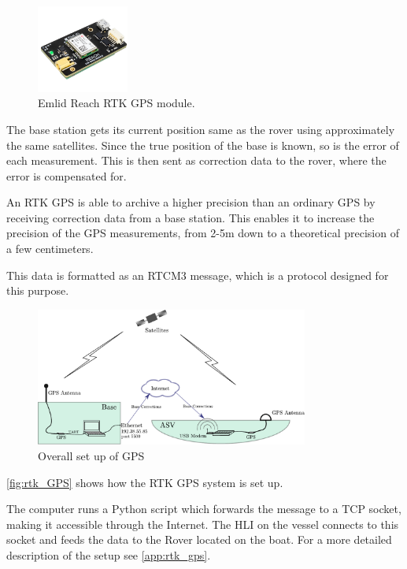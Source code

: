 \begin{figure}[H]
  \includegraphics[width=0.27\textwidth]{figures/emlidReach}
  \caption{Emlid Reach RTK GPS module.\cite{EmlidReachDocs}}
  \label{fig:emlidReach}
\end{figure}

The base station gets its current position same as the rover using approximately the same satellites. Since the true position of the base is known, so is the error of each measurement. This is then sent as correction data to the rover, where the error is compensated for.%

An RTK GPS is able to archive a higher precision than an ordinary GPS by receiving correction data from a base station.
This enables it to increase the precision of the GPS measurements, from 2-5m down to a theoretical precision of a few centimeters.\cite{EmlidRTK}

This data is formatted as an RTCM3 message, which is a protocol designed for this purpose.
\begin{figure}[H]
	\includegraphics[width=0.8\textwidth]{figures/comunicationSetup.pdf}
	\caption{Overall set up of GPS}
	\label{fig:rtk_GPS}
\end{figure}
\autoref{fig:rtk_GPS} shows how the RTK GPS system is set up. 

The computer runs a Python script which forwards the message to a TCP socket, making it accessible through the Internet. The HLI on the vessel connects to this socket and feeds the data to the Rover located on the boat. For a more detailed description of the setup see \autoref{app:rtk_gps}.
